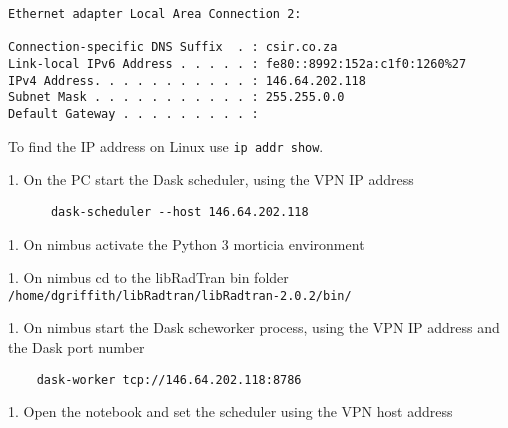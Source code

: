 \begin{lstlisting}
Ethernet adapter Local Area Connection 2:

Connection-specific DNS Suffix  . : csir.co.za
Link-local IPv6 Address . . . . . : fe80::8992:152a:c1f0:1260%27
IPv4 Address. . . . . . . . . . . : 146.64.202.118
Subnet Mask . . . . . . . . . . . : 255.255.0.0
Default Gateway . . . . . . . . . :
\end{lstlisting}

    To find the IP address on Linux use \lstinline{ip addr show}.


1. On the PC start the Dask scheduler, using the VPN IP address


\begin{lstlisting}
      dask-scheduler --host 146.64.202.118
\end{lstlisting}

1. On nimbus activate the Python 3 morticia environment 

1. On nimbus cd to the libRadTran bin folder  \lstinline{/home/dgriffith/libRadtran/libRadtran-2.0.2/bin/}

1. On nimbus start the Dask scheworker process, using the VPN IP address and the Dask port number

\begin{lstlisting}
    dask-worker tcp://146.64.202.118:8786
\end{lstlisting}

1. Open the notebook and set the scheduler using the VPN host address



